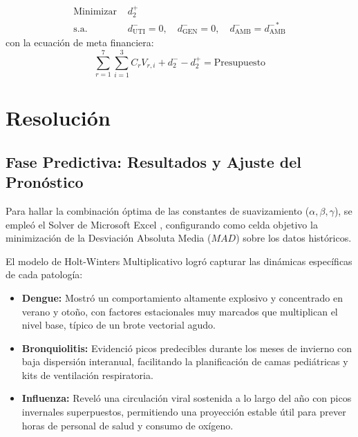 \documentclass[conference]{IEEEtran}
\begin{document}
\begin{enumerate}
          \begin{equation}
              \begin{aligned}
                  \text{Minimizar } & d_2^+                                                                                          \\
                  \text{s.a. }      & d_{\text{UTI}}^- = 0, \quad d_{\text{GEN}}^- = 0, \quad d_{\text{AMB}}^- = d_{\text{AMB}}^{-*}
              \end{aligned}
          \end{equation}
          con la ecuación de meta financiera:
          \begin{equation}
              \sum_{r=1}^{7} \sum_{i=1}^{3} C_r V_{r,i} + d_2^- - d_2^+ = \text{Presupuesto}
          \end{equation}
\end{enumerate}




\section{Resolución}

\subsection{Fase Predictiva: Resultados y Ajuste del Pronóstico}
Para hallar la combinación óptima de las constantes de suavizamiento ($\alpha, \beta, \gamma$), se empleó el Solver de Microsoft Excel \cite{refExcel}, configurando como celda objetivo la minimización de la Desviación Absoluta Media ($MAD$) sobre los datos históricos.

El modelo de Holt-Winters Multiplicativo logró capturar las dinámicas específicas de cada patología:
\begin{itemize}
    \item \textbf{Dengue:} Mostró un comportamiento altamente explosivo y concentrado en verano y otoño, con factores estacionales muy marcados que multiplican el nivel base, típico de un brote vectorial agudo.
    \item \textbf{Bronquiolitis:} Evidenció picos predecibles durante los meses de invierno con baja dispersión interanual, facilitando la planificación de camas pediátricas y kits de ventilación respiratoria.
    \item \textbf{Influenza:} Reveló una circulación viral sostenida a lo largo del año con picos invernales superpuestos, permitiendo una proyección estable útil para prever horas de personal de salud y consumo de oxígeno.
\end{itemize}
\end{document}
